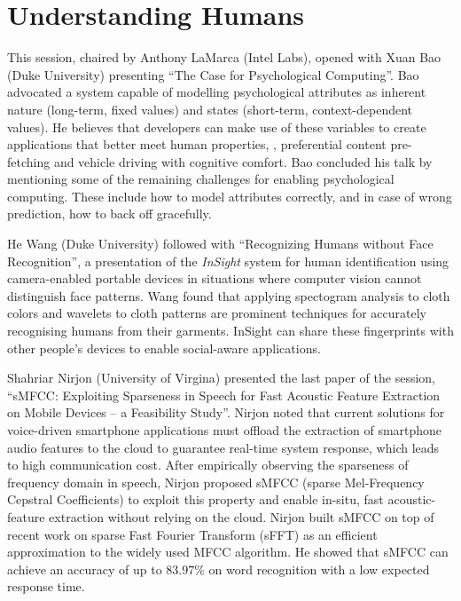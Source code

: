 \section{Understanding Humans}
\label{sec:humans}

This session, chaired by Anthony LaMarca (Intel Labs), opened with Xuan
Bao (Duke University) presenting ``The Case for Psychological
Computing''. Bao advocated a system capable of modelling psychological
attributes as inherent nature (long-term, fixed values) and states
(short-term, context-dependent values). He believes that developers can
make use of these variables to create applications that better meet
human properties, \eg, preferential content pre-fetching and vehicle
driving with cognitive comfort. Bao concluded his talk by mentioning
some of the remaining challenges for enabling psychological computing.
These include how to model attributes correctly, and in case of wrong
prediction, how to back off gracefully.

He Wang (Duke University) followed with ``Recognizing Humans without Face
Recognition'', a presentation of the \emph{InSight} system for human
identification using camera-enabled portable devices in situations where
computer vision cannot distinguish face patterns. Wang found that
applying spectogram analysis to cloth colors and wavelets to cloth
patterns are prominent techniques for accurately recognising humans from
their garments. InSight can share these fingerprints with other people's
devices to enable social-aware applications.

Shahriar Nirjon (University of Virgina) presented the last paper of
the session, ``sMFCC: Exploiting Sparseness in Speech for Fast Acoustic
Feature Extraction on Mobile Devices -- a Feasibility Study''. Nirjon
noted that current solutions for voice-driven smartphone applications
must offload the extraction of smartphone audio features to the cloud to
guarantee real-time system response, which leads to high communication
cost. After empirically observing the sparseness of frequency domain in
speech, Nirjon proposed sMFCC (sparse Mel-Frequency Cepstral
Coefficients) to exploit this property and enable in-situ, fast
acoustic-feature extraction without relying on the cloud. Nirjon built
sMFCC on top of recent work on sparse Fast Fourier Transform (sFFT) as
an efficient approximation to the widely used MFCC algorithm. He showed
that sMFCC can achieve an accuracy of up to $83.97\%$ on word
recognition with a low expected response time.
